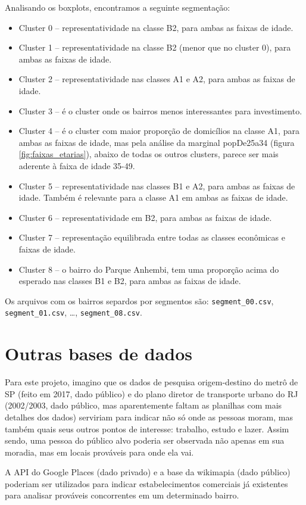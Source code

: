 \documentclass[10pt, a4paper]{article}
\begin{document}
Analisando os boxplots, encontramos a seguinte segmentação:

\begin{itemize}
\item Cluster 0 -- representatividade na classe B2, para ambas as
  faixas de idade.
\item Cluster 1 -- representatividade na classe B2 (menor que no
  cluster 0), para ambas as faixas de idade.
\item Cluster 2 -- representatividade nas classes A1 e A2, para ambas
  as faixas de idade.
\item Cluster 3 -- é o cluster onde os bairros menos interessantes
  para investimento.
\item Cluster 4 -- é o cluster com maior proporção de domicílios na
  classe A1, para ambas as faixas de idade, mas pela análise da
  marginal popDe25a34 (figura \ref{fig:faixas_etarias}), abaixo de
  todas os outros clusters, parece ser mais aderente à faixa de idade
  35-49.
\item Cluster 5 -- representatividade nas classes B1 e A2, para ambas
  as faixas de idade. Também é relevante para a classe A1 em ambas as
  faixas de idade.
\item Cluster 6 -- representatividade em B2, para ambas as faixas de
  idade.
\item Cluster 7 -- representação equilibrada entre todas as classes
  econômicas e faixas de idade.
\item Cluster 8 -- o bairro do Parque Anhembi, tem uma proporção acima
  do esperado nas classes B1 e B2, para ambas as faixas de idade.
\end{itemize}

Os arquivos com os bairros separdos por segmentos são:
\texttt{segment\_00.csv}, \texttt{segment\_01.csv}, \dots,
\texttt{segment\_08.csv}.

\section{Outras bases de dados}

Para este projeto, imagino que os dados de pesquisa origem-destino do
metrô de SP (feito em 2017, dado público) e do plano diretor de
transporte urbano do RJ (2002/2003, dado público, mas aparentemente
faltam as planilhas com mais detalhes dos dados) serviriam para
indicar não só onde as pessoas moram, mas também quais seus outros
pontos de interesse: trabalho, estudo e lazer. Assim sendo, uma pessoa
do público alvo poderia ser observada não apenas em sua moradia, mas
em locais prováveis para onde ela vai.

A API do Google Places (dado privado) e a base da wikimapia (dado
público) poderiam ser utilizados para indicar estabelecimentos
comerciais já existentes para analisar prováveis concorrentes em um
determinado bairro.
\end{document}
